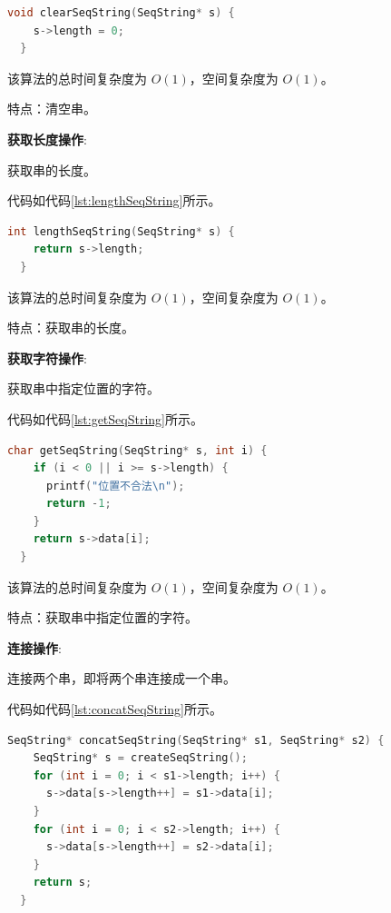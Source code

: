 \documentclass[lang=cn,newtx,10pt,scheme=chinese]{elegantbook}
\begin{document}
\begin{lstlisting}[language=C++, caption={清空串示例代码}, label={lst:clearSeqString}]
  void clearSeqString(SeqString* s) {
    s->length = 0;
  }

\end{lstlisting}

该算法的总时间复杂度为 $O(1)$，空间复杂度为 $O(1)$。

特点：清空串。

\textbf{获取长度操作}:

获取串的长度。

代码如代码\ref{lst:lengthSeqString}所示。

\begin{lstlisting}[language=C++, caption={获取串的长度示例代码}, label={lst:lengthSeqString}]
  int lengthSeqString(SeqString* s) {
    return s->length;
  }

\end{lstlisting}

该算法的总时间复杂度为 $O(1)$，空间复杂度为 $O(1)$。

特点：获取串的长度。

\textbf{获取字符操作}:

获取串中指定位置的字符。

代码如代码\ref{lst:getSeqString}所示。

\begin{lstlisting}[language=C++, caption={获取串中指定位置的字符示例代码}, label={lst:getSeqString}]
  char getSeqString(SeqString* s, int i) {
    if (i < 0 || i >= s->length) {
      printf("位置不合法\n");
      return -1;
    }
    return s->data[i];
  }

\end{lstlisting}

该算法的总时间复杂度为 $O(1)$，空间复杂度为 $O(1)$。

特点：获取串中指定位置的字符。

\textbf{连接操作}:

连接两个串，即将两个串连接成一个串。

代码如代码\ref{lst:concatSeqString}所示。

\begin{lstlisting}[language=C++, caption={连接两个串示例代码}, label={lst:concatSeqString}]
  SeqString* concatSeqString(SeqString* s1, SeqString* s2) {
    SeqString* s = createSeqString();
    for (int i = 0; i < s1->length; i++) {
      s->data[s->length++] = s1->data[i];
    }
    for (int i = 0; i < s2->length; i++) {
      s->data[s->length++] = s2->data[i];
    }
    return s;
  }

\end{lstlisting}
\end{document}
